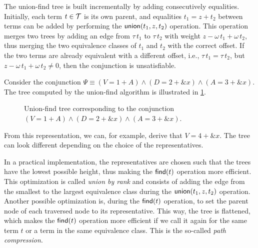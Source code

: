 The union-find tree is built incrementally by adding consecutively equalities.
Initially, each term $t\in\mathcal{T}$ is its own parent, and equalities $t_1 = z + t_2$ between terms can be added by performing the $\textsf{union}(t_1, z, t_2)$ operation.
This operation merges two trees by adding an edge from $\tau\,t_1$ to $\tau\,t_2$ with weight $z - \omega\,t_1 + \omega\,t_2$,
thus merging the two equivalence classes of $t_1$ and $t_2$ with the correct offset.
If the two terms are already equivalent with a different offset, i.e., $\tau\,t_1 = \tau\,t_2$, but $z - \omega\,t_1 + \omega\,t_2 \neq 0$, then the conjunction is unsatisfiable.

\begin{example}
  Consider the conjunction $\Psi \equiv (V = 1 + A) \land (D = 2 + \&x) \land (A = 3 + \&x)$.
  The tree computed by the union-find algorithm is illustrated in \cref{fig:uf-tree}.
  \begin{figure}
    \centering
    \caption[An example of a union-find tree.]{Union-find tree corresponding to the conjunction  $(V = 1 + A) \land (D = 2 + \&x) \land (A = 3 + \&x)$.}\label{fig:uf-tree}
  \end{figure}
  From this representation, we can, for example, derive that $V = 4 + \&x$.
  The tree can look different depending on the choice of the representatives.
\end{example}

In a practical implementation, the representatives are chosen such that the trees have the lowest possible height, thus making the $\textsf{find}(t)$ operation more efficient.
This optimization is called \emph{union by rank} and consists of adding the edge from the smallest to the largest equivalence class during the $\textsf{union}(t_1, z, t_2)$ operation.
Another possible optimization is, during the $\textsf{find}(t)$ operation, to set the parent node of each traversed node to its representative.
This way, the tree is flattened, which makes the $\textsf{find}(t)$ operation
more efficient if we call it again for the same term $t$ or a term in the same equivalence class.
This is the so-called \emph{path compression}.~\cite{uf-tarjan}


